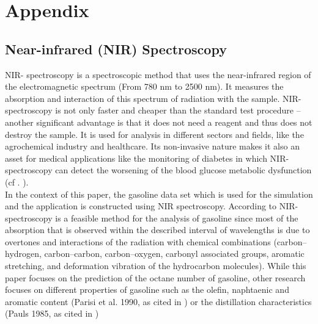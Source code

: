\documentclass[11pt,twoside,a4paper]{article}
\begin{document}
	\nocite{James.2009} %
	
	\newpage
	\section{Appendix}
	
	\subsection{Near-infrared (NIR) Spectroscopy}\label{NIR}
	NIR- spectroscopy is a spectroscopic method that uses the near-infrared region of the electromagnetic spectrum (From 780 nm to 2500 nm). It measures the absorption and interaction of this spectrum of radiation with the sample. NIR-spectroscopy is not only faster and cheaper than the standard test procedure – another significant advantage is that it does not need a reagent and thus does not destroy the sample. It is used for analysis in different sectors and fields, like the agrochemical industry and healthcare. Its non-invasive nature makes it also an asset for medical applications like the monitoring of diabetes in which NIR-spectroscopy can detect the worsening of the blood glucose metabolic dysfunction (cf . \cite{FR_li_et_al_2020}). \\
	In the context of this paper, the gasoline data set which is used for the simulation and the application is constructed using NIR spectroscopy. According to \cite{Bohacs_Ovadi_Salgo1998} NIR-spectroscopy is a feasible method for the analysis of gasoline since most of the absorption that is observed within the described interval of wavelengths is due to overtones and interactions of the radiation with chemical combinations (carbon–hydrogen, carbon–carbon, carbon–oxygen, carbonyl associated groups, aromatic stretching, and deformation vibration of the hydrocarbon molecules). While this paper focuses on the prediction of the octane number of gasoline, other research focuses  on different properties of gasoline such as the olefin, naphtaenic and aromatic content (Parisi et al. 1990, as cited in \cite{Bohacs_Ovadi_Salgo1998}) or the distillation characteristics (Pauls 1985, as cited in \cite{Bohacs_Ovadi_Salgo1998})
	\vspace{0.5cm}
\end{document}
